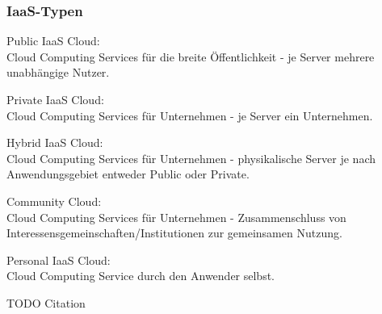 \documentclass[12pt,a4paper,bibliography=totocnumbered,listof=totocnumbered]{scrartcl}
\begin{document}
\subsubsection{IaaS-Typen}
\begin{compactitem}
\item Public IaaS Cloud:\\
Cloud Computing Services für die breite Öffentlichkeit - je Server mehrere unabhängige Nutzer.
\item Private IaaS Cloud:\\
Cloud Computing Services für Unternehmen - je Server ein Unternehmen.
\item Hybrid IaaS Cloud:\\
Cloud Computing Services für Unternehmen - physikalische Server je nach Anwendungsgebiet entweder Public oder Private.
\item Community Cloud:\\
Cloud Computing Services für Unternehmen - Zusammenschluss von Interessensgemeinschaften/Institutionen zur gemeinsamen Nutzung.
\item Personal IaaS Cloud:\\
Cloud Computing Service durch den Anwender selbst.
\end{compactitem}

TODO Citation
\end{document}
